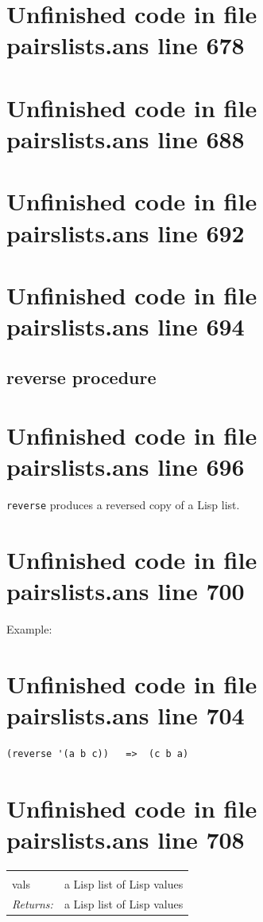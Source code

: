 \documentclass[twoside,9pt]{report}
\begin{document}
\section{Unfinished code in file pairslists.ans line 678}
\section{Unfinished code in file pairslists.ans line 688}
\section{Unfinished code in file pairslists.ans line 692}
\section{Unfinished code in file pairslists.ans line 694}
\subsection{reverse procedure}
\label{reverse-procedure}
\section{Unfinished code in file pairslists.ans line 696}


\texttt{reverse} produces a reversed copy of a Lisp list.

\section{Unfinished code in file pairslists.ans line 700}


Example:

\section{Unfinished code in file pairslists.ans line 704}
\begin{verbatim}
(reverse '(a b c))   =>  (c b a)
\end{verbatim}
\section{Unfinished code in file pairslists.ans line 708}
\noindent\begin{tabular}{ |p{1.9cm} p{8cm}| }
\hline
\rowcolor[HTML]{CCCCCC} \multicolumn{2}{|l|}{\bf reverse (public)} \\
vals & a Lisp list of Lisp values \\
\textit{Returns:} & a Lisp list of Lisp values \\
\hline
\end{tabular}
\end{document}
